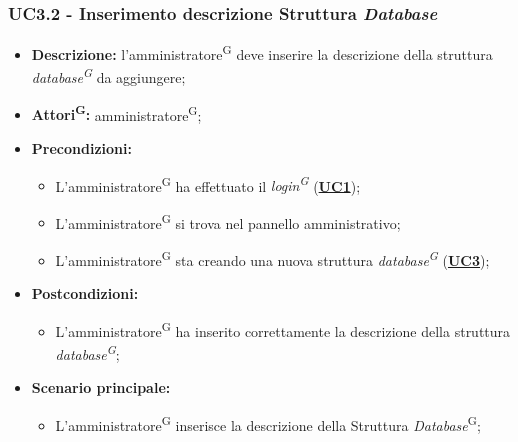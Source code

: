 \subsubsection{UC3.2 - Inserimento descrizione Struttura \textit{Database}}
\label{sec:UC3.2}
\begin{itemize}
	\item \textbf{Descrizione:} l’amministratore\textsuperscript{G} deve inserire la descrizione della struttura  \textit{database\textsuperscript{G}} da aggiungere;
	\item \textbf{Attori\textsuperscript{G}:} amministratore\textsuperscript{G};
	\item \textbf{Precondizioni:} 
	\begin{itemize}
		\item L’amministratore\textsuperscript{G} ha effettuato il \textit{login\textsuperscript{G}} (\hyperref[sec:UC1]{\textbf{UC1}});
		\item L’amministratore\textsuperscript{G} si trova nel pannello amministrativo;
		\item L’amministratore\textsuperscript{G} sta creando una nuova struttura \textit{database\textsuperscript{G}} (\hyperref[sec:UC3]{\textbf{UC3}});
	\end{itemize}
	\item \textbf{Postcondizioni:} 
	\begin{itemize}
		\item L'amministratore\textsuperscript{G} ha inserito correttamente la descrizione della struttura  \textit{database\textsuperscript{G}};
	\end{itemize}
	\item \textbf{Scenario principale:} 
	\begin{itemize}
		\item L’amministratore\textsuperscript{G} inserisce la descrizione della Struttura \textit{Database}\textsuperscript{G};
	\end{itemize}
\end{itemize}


